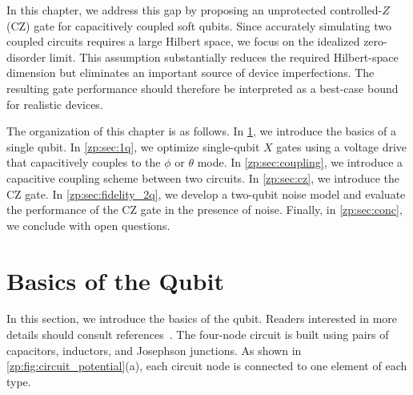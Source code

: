 In this chapter, we address this gap by proposing an unprotected controlled-$Z$ (CZ) gate for capacitively coupled soft \zps qubits.
Since accurately simulating two coupled \zps circuits requires a large Hilbert space, we focus on the idealized zero-disorder limit.
This assumption substantially reduces the required Hilbert-space dimension but eliminates an important source of device imperfections.
The resulting gate performance should therefore be interpreted as a best-case bound for realistic devices.

The organization of this chapter is as follows.
In \cref{zp:sec:basics}, we introduce the basics of a single \zps qubit.
In \cref{zp:sec:1q}, we optimize single-qubit $X$ gates using a voltage drive that capacitively couples to the $\phi$ or $\theta$ mode.
In \cref{zp:sec:coupling}, we introduce a capacitive coupling scheme between two \zps circuits.
In \cref{zp:sec:cz}, we introduce the CZ gate.
In \cref{zp:sec:fidelity_2q}, we develop a two-qubit noise model and evaluate the performance of the CZ gate in the presence of noise.
Finally, in \cref{zp:sec:conc}, we conclude with open questions.

\section{Basics of the \texorpdfstring{\zp}{zero pi} Qubit}\label{zp:sec:basics}
In this section, we introduce the basics of the \zps qubit.
Readers interested in more details should consult references~\cite{Dempster2014understanding,paolo_control_2019,groszkowski2018,Gyenis_zero_pi_2021a}.
The four-node \zps circuit is built using pairs of capacitors, inductors, and Josephson junctions.
As shown in \cref{zp:fig:circuit_potential}(a), each circuit node is connected to one element of each type.

